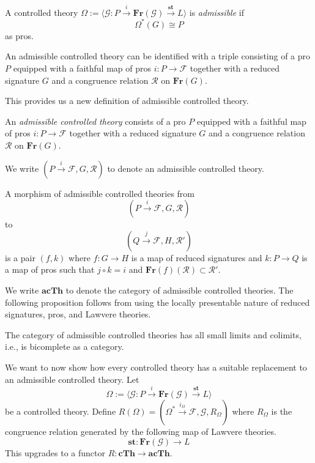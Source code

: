 \documentclass{tac}
\begin{document}
    \begin{definition}
    A controlled theory $\Omega:=\langle \mathcal{G}:P\xrightarrow{i}\mathbf{Fr}(\mathcal{G})\xrightarrow{\mathbf{st}}L\rangle$ is \emph{admissible} if 
    \[
    \Omega^*(G)\cong P
    \]
    as pros.
    \end{definition}

\begin{lemma}
    An admissible controlled theory can be identified with a triple consisting of a pro $P$ equipped with a faithful map of pros $i:P\to\mathcal{F}$ together with a reduced signature $G$ and a congruence relation $\mathcal{R}$ on $\mathbf{Fr}(G)$.
\end{lemma}

This provides us a new definition of admissible controlled theory.

\begin{definition}
An \emph{admissible controlled theory} consists of a pro $P$ equipped with a faithful map of pros $i:P\to\mathcal{F}$ together with a reduced signature $G$ and a congruence relation $\mathcal{R}$ on $\mathbf{Fr}(G)$.

We write $(P\xrightarrow{i}\mathcal{F},G,\mathcal{R})$ to denote an admissible controlled theory.
\end{definition}

\begin{definition}
A morphism of admissible controlled theories from 
\[
(P\xrightarrow{i}\mathcal{F},G,\mathcal{R})
\]
to 
\[
(Q\xrightarrow{j}\mathcal{F},H,\mathcal{R}')
\]
is a pair $(f,k)$ where $f:G\to H$ is a map of reduced signatures and $k:P\to Q$ is a map of pros such that $j\circ k=i$ and $\mathbf{Fr}(f)(\mathcal{R})\subset \mathcal{R}'$.
\end{definition}

We write $\mathbf{acTh}$ to denote the category of admissible controlled theories. The following proposition follows from using the locally presentable nature of reduced signatures, pros, and Lawvere theories.

\begin{proposition}
The category of admissible controlled theories has all small limits and colimits, i.e., is bicomplete as a category.
\end{proposition}


We want to now show how every controlled theory has a suitable replacement to an admissible controlled theory. Let 
\[
\Omega:=\langle \mathcal{G}:P\xrightarrow{i}\mathbf{Fr}(\mathcal{G})\xrightarrow{\mathbf{st}}L\rangle
\]
be a controlled theory. Define $R(\Omega)=(\Omega^*\xrightarrow{i_\Omega}\mathcal{F},\mathcal{G},R_\Omega)$ where $R_\Omega$ is the congruence relation generated by the following map of Lawvere theories.
\[
\mathbf{st}:\mathbf{Fr}(\mathcal{G})\to L
\]
This upgrades to a functor $R:\mathbf{cTh}\to \mathbf{acTh}$. 
\end{document}

